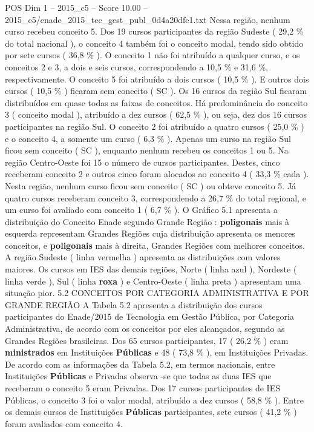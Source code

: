 \begin{textsample}{POS Dim 1 – 2015\_c5 – Score 10.00 – 2015\_c5/enade\_2015\_tec\_gest\_publ\_0d4a20dfe1.txt}
Nessa região, nenhum curso recebeu conceito 5.
Dos 19 cursos participantes da região Sudeste ( 29,2 \% do total nacional ), o conceito 4 também foi o conceito modal, tendo sido obtido por sete cursos ( 36,8 \% ).
O conceito 1 não foi atribuído a qualquer curso, e os conceitos 2 e 3, a dois e seis cursos, correspondendo a 10,5 \% e 31,6 \%, respectivamente.
O conceito 5 foi atribuído a dois cursos ( 10,5 \% ).
E outros dois cursos ( 10,5 \% ) ficaram sem conceito ( SC ).
Os 16 cursos da região Sul ficaram distribuídos em quase todas as faixas de conceitos.
Há predominância do conceito 3 ( conceito modal ), atribuído a dez cursos ( 62,5 \% ), ou seja, dez dos 16 cursos participantes na região Sul.
O conceito 2 foi atribuído a quatro cursos ( 25,0 \% ) e o conceito 4, a somente um curso ( 6,3 \% ).
Apenas um curso na região Sul ficou sem conceito ( SC ), enquanto nenhum recebeu os conceitos 1 ou 5.
Na região Centro-Oeste foi 15 o número de cursos participantes.
Destes, cinco receberam conceito 2 e outros cinco foram alocados ao conceito 4 ( 33,3 \% cada ).
Nesta região, nenhum curso ficou sem conceito ( SC ) ou obteve conceito 5.
Já quatro cursos receberam conceito 3, correspondendo a 26,7 \% do total regional, e um curso foi avaliado com conceito 1 ( 6,7 \% ).
O Gráfico 5.1 apresenta a distribuição do Conceito Enade segundo Grande Região : \textbf{poligonais} mais à esquerda representam Grandes Regiões cuja distribuição apresenta os menores conceitos, e \textbf{poligonais} mais à direita, Grandes Regiões com melhores conceitos.
A região Sudeste ( linha vermelha ) apresenta as distribuições com valores maiores.
Os cursos em IES das demais regiões, Norte ( linha azul ), Nordeste ( linha verde ), Sul ( linha \textbf{roxa} ) e Centro-Oeste ( linha preta ) apresentam uma situação pior. 5.2 CONCEITOS POR CATEGORIA ADMINISTRATIVA E POR GRANDE REGIÃO A Tabela 5.2 apresenta a distribuição dos cursos participantes do Enade/2015 de Tecnologia em Gestão Pública, por Categoria Administrativa, de acordo com os conceitos por eles alcançados, segundo as Grandes Regiões brasileiras.
Dos 65 cursos participantes, 17 ( 26,2 \% ) eram \textbf{ministrados} em Instituições \textbf{Públicas} e 48 ( 73,8 \% ), em Instituições Privadas.
De acordo com as informações da Tabela 5.2, em termos nacionais, entre Instituições \textbf{Públicas} e Privadas observa -se que todas as duas IES que receberam o conceito 5 eram Privadas.
Dos 17 cursos participantes de IES Públicas, o conceito 3 foi o valor modal, atribuído a dez cursos ( 58,8 \% ).
Entre os demais cursos de Instituições \textbf{Públicas} participantes, sete cursos ( 41,2 \% ) foram avaliados com conceito 4.

\end{textsample}
